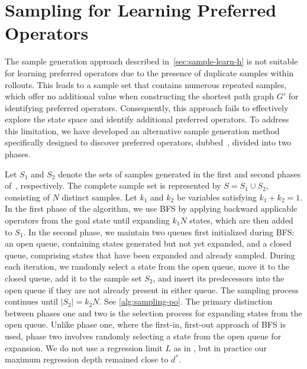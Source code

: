 \documentclass[ppgc,diss,english]{iiufrgs}
\begin{document}
\section{Sampling for Learning Preferred Operators}
\label{sec:sample-learn-po}
The sample generation approach described in~\cref{sec:sample-learn-h} is not suitable for learning preferred operators due to the presence of duplicate samples within rollouts. This leads to a sample set that contains numerous repeated samples, which offer no additional value when constructing the shortest path graph $G'$ for identifying preferred operators. Consequently, this approach fails to effectively explore the state space and identify additional preferred operators. To address this limitation, we have developed an alternative sample generation method specifically designed to discover preferred operators, dubbed~\bfsrs, divided into two phases.

Let $S_1$ and $S_2$ denote the sets of samples generated in the first and second phases of~\bfsrs, respectively. The complete sample set is represented by $S = S_1 \cup S_2$, consisting of $N$ distinct samples. Let $k_1$ and $k_2$ be variables satisfying $k_1 + k_{2} = 1$.
In the first phase of the algorithm, we use BFS by applying backward applicable operators from the goal state until expanding $k_1N$ states, which are then added to $S_1$.
In the second phase, we maintain two queues first initialized during BFS: an open queue, containing states generated but not yet expanded, and a closed queue, comprising states that have been expanded and already sampled. During each iteration, we randomly select a state from the open queue, move it to the closed queue, add it to the sample set $S_2$, and insert its predecessors into the open queue if they are not already present in either queue. The sampling process continues until $|S_2| = k_2N$.
See \cref{alg:sampling-po}. The primary distinction between phases one and two is the selection process for expanding states from the open queue. Unlike phase one, where the first-in, first-out approach of BFS is used, phase two involves randomly selecting a state from the open queue for expansion. We do not use a regression limit $L$ as in \bfsrw, but in practice our maximum regression depth remained close to $d^{*}$.
\end{document}
